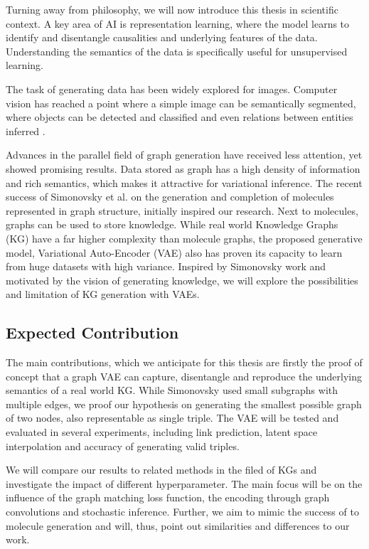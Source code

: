 Turning away from philosophy, we will now introduce this thesis in scientific context. A key area of AI is representation learning, where the model learns to identify and disentangle causalities and underlying features of the data. Understanding the semantics of the data is specifically useful for unsupervised learning. 


The task of generating data has been widely explored for images. Computer vision has reached a point where a simple image can be semantically segmented, where objects can be detected and classified and even relations between entities inferred \cite{kipf_contrastive_2020}.


Advances in the parallel field of  graph generation have received less attention, yet showed promising results. Data stored as graph has a high density of information and rich semantics, which makes it attractive for variational inference. The recent success of Simonovsky et al. \cite{simonovsky_graphvae_2018} on the generation and completion of molecules represented in graph structure, initially inspired our research. Next to molecules, graphs can be used to store knowledge. While real world Knowledge Graphs (KG) have a far higher complexity than molecule graphs, the proposed generative model, Variational Auto-Encoder (VAE) also has proven its capacity to learn from huge datasets with high variance. Inspired by Simonovsky work and motivated by the vision of generating knowledge, we will explore the possibilities and limitation of KG generation with VAEs.



\subsection{Expected Contribution}

The main contributions, which we anticipate for this thesis are firstly the proof of concept that a graph VAE can capture, disentangle and reproduce the underlying semantics of a real world KG. While Simonovsky used small subgraphs with multiple edges, we proof our hypothesis on  generating the smallest possible graph of two nodes, also representable as single triple. The VAE will be tested and evaluated in several experiments, including link prediction, latent space interpolation and accuracy of generating valid triples.


We will compare our results to related methods in the filed of KGs and investigate the impact of different hyperparameter. The main focus will be on the influence of the graph matching loss function, the encoding through graph convolutions and stochastic inference. Further, we aim to mimic the success of to molecule generation and will, thus, point out similarities and differences to our work.

